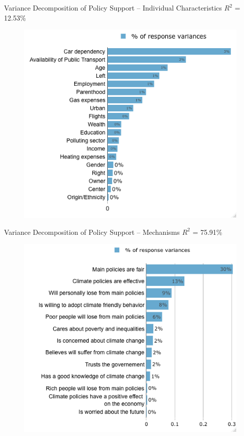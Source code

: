 \begin{framefont}{\small}
\begin{frame}{Variance Decomposition of Policy Support -- Individual Characteristics}%
\vspace{-.1cm}
{\footnotesize $R^2$ = 12.53\%}
\begin{figure}[h!]
\vspace{-.1cm}
\includegraphics[width=.62\textwidth]{../figures/FR/lmg_main_policies_socio_non_standardized} \\
\end{figure}
\end{frame}

\begin{frame}{Variance Decomposition of Policy Support -- Mechanisms}%
\vspace{-.1cm}
{\footnotesize $R^2$ = 75.91\%}
\begin{figure}[h!]
\vspace{-.1cm}
\includegraphics[width=.62\textwidth]{../figures/FR/lmg_main_policies_indices_non_standardized} \\
\end{figure}
\end{frame}


\end{framefont}
